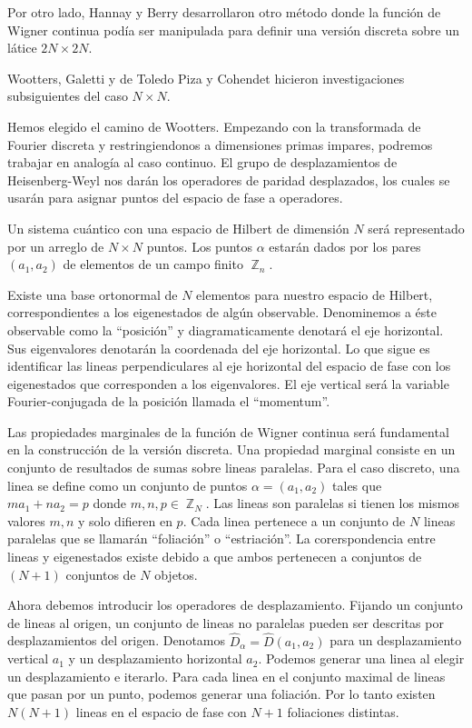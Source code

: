 \documentclass[a4paper]{report}
\DeclareMathOperator{\Z}{\mathbb{Z}}
\begin{document}
  Por otro lado, Hannay y Berry desarrollaron otro método
  donde la función de Wigner continua podía ser manipulada
  para definir una versión discreta sobre un látice $2N
  \times 2N$.

  Wootters, Galetti y de Toledo Piza y Cohendet hicieron
  investigaciones subsiguientes del caso $N \times N$.

  Hemos elegido el camino de Wootters. Empezando con la
  transformada de Fourier discreta y restringiendonos a
  dimensiones primas impares, podremos trabajar en analogía
  al caso continuo. El grupo de desplazamientos de
  Heisenberg-Weyl nos darán los operadores de paridad
  desplazados, los cuales se usarán para asignar puntos del
  espacio de fase a operadores.

  Un sistema cuántico con una espacio de Hilbert de
  dimensión $N$ será representado por un arreglo de $N
  \times N$ puntos. Los puntos $\alpha$ estarán dados por
  los pares $(a_1,a_2)$ de elementos de un campo finito
  $\Z_n$.

  Existe una base ortonormal de $N$ elementos para nuestro
  espacio de Hilbert, correspondientes a los eigenestados de
  algún observable. Denominemos a éste observable como la
  ``posición'' y diagramaticamente denotará el eje
  horizontal. Sus eigenvalores denotarán la coordenada del
  eje horizontal. Lo que sigue es identificar las lineas
  perpendiculares al eje horizontal del espacio de fase con
  los eigenestados que corresponden a los eigenvalores. El
  eje vertical será la variable Fourier-conjugada de la
  posición llamada el ``momentum''.

  Las propiedades marginales de la función de Wigner
  continua será fundamental en la construcción de la versión
  discreta. Una propiedad marginal consiste en un conjunto
  de resultados de sumas sobre lineas paralelas. Para el
  caso discreto, una linea se define como un conjunto de
  puntos $\alpha = (a_1,a_2)$ tales que $ma_1 + na_2 = p$ 
  donde $m, n, p \in \Z_N$. Las lineas son paralelas si
  tienen los mismos valores $m,n$ y solo difieren en $p$.
  Cada linea pertenece a un conjunto de $N$ lineas paralelas
  que se llamarán ``foliación'' o ``estriación''. La
  corerspondencia entre lineas y eigenestados existe debido
  a que ambos pertenecen a conjuntos de $(N+1)$ conjuntos de
  $N$ objetos.

  Ahora debemos introducir los operadores de desplazamiento.
  Fijando un conjunto de lineas al origen, un conjunto de
  lineas no paralelas pueden ser descritas por
  desplazamientos del origen. Denotamos $\hat{D}_\alpha =
  \hat{D}(a_1,a_2)$ para un desplazamiento vertical $a_1$ y
  un desplazamiento horizontal $a_2$. Podemos generar una
  linea al elegir un desplazamiento e iterarlo. Para cada
  linea en el conjunto maximal de lineas que pasan por un
  punto, podemos generar una foliación. Por lo tanto existen
  $N(N+1)$ lineas en el espacio de fase con $N+1$ 
  foliaciones distintas.
\end{document}
